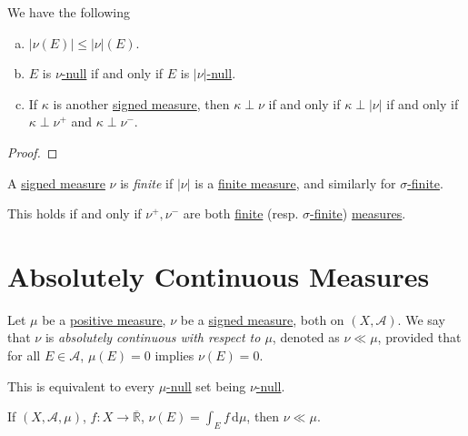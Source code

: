 \begin{lemma}
	We have the following
	\begin{enumerate}[(a)]
		\item \(\left\vert \nu(E) \right\vert \leq \left\vert \nu \right\vert(E)\).
		\item \(E\) is \hyperref[def:null-set-for-a-signed-measure]{\(\nu\)-null} if and only if \(E\) is \hyperref[def:null-set-for-a-signed-measure]{\(\left\vert \nu \right\vert\)-null}.
		\item If \(\kappa\) is another \hyperref[def:signed-measure]{signed measure}, then \(\kappa \perp \nu\)
		      if and only if \(\kappa \perp \left\vert \nu \right\vert\) if and only if \(\kappa \perp \nu^+\) and \(\kappa \perp \nu^-\).
	\end{enumerate}
\end{lemma}
\begin{proof}
\end{proof}

\begin{definition}\label{def:finite-signed-measure}
	A \hyperref[def:signed-measure]{signed measure} \(\nu\) is \emph{finite} if \(\left\vert \nu \right\vert\) is a \hyperref[def:finite-measure]{finite measure},
	and similarly for \hyperref[def:sigma-finite-measure]{\(\sigma\)-finite}.
\end{definition}
\begin{remark}
	This holds if and only if \(\nu^+,\nu^-\) are both \hyperref[def:finite-measure]{finite} (resp. \hyperref[def:sigma-finite-measure]{\(\sigma\)-finite})
	\hyperref[def:measure]{measures}.
\end{remark}

\section{Absolutely Continuous Measures}
\begin{definition}\label{def:absolutely-continuous-measure}
	Let \(\mu\) be a \hyperref[def:signed-measure]{positive measure}, \(\nu\) be a \hyperref[def:signed-measure]{signed measure}, both on \((X, \mathcal{A})\). We say that \(\nu\) is
	\emph{absolutely continuous with respect to \(\mu\)}, denoted as \(\nu \ll \mu\), provided that for all \(E \in \mathcal{A}\), \(\mu(E) = 0\) implies \(\nu(E) = 0\).
\end{definition}
\begin{remark}
	This is equivalent to every \hyperref[def:null-set-for-a-signed-measure]{\(\mu\)-null} set being \hyperref[def:null-set-for-a-signed-measure]{\(\nu\)-null}.
\end{remark}
\begin{eg}
	If \((X ,\mathcal{A}, \mu)\), \(f \colon X \to \overline{\mathbb{R}}\), \(\nu(E) = \int_E f \,\mathrm{d} \mu\), then \(\nu \ll \mu\).
\end{eg}

